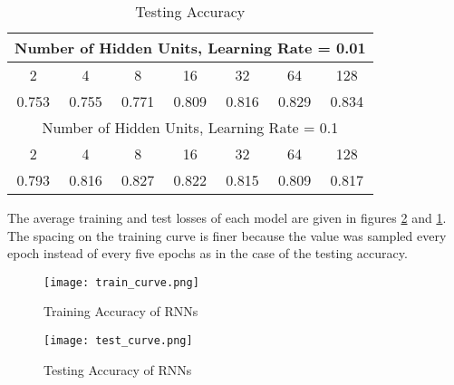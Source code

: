 \begin{table}
\centering
\begin{tabular}{ |c|c|c|c|c|c|c|}
    \hline
    \multicolumn{7}{|c|}{Number of Hidden Units, Learning Rate = 0.01}\\ \hline
    2 & 4 & 8 & 16 & 32 & 64 & 128 \\ \hline
    0.753 & 0.755 & 0.771 & 0.809 & 0.816 & 0.829 & 0.834 \\ \hline
    \multicolumn{7}{|c|}{Number of Hidden Units, Learning Rate = 0.1}\\ \hline
    2 & 4 & 8 & 16 & 32 & 64 & 128 \\ \hline
    0.793 & 0.816 & 0.827 & 0.822 & 0.815 & 0.809 & 0.817 \\ \hline
\end{tabular}
\caption{Testing Accuracy}
\label{tab:test_accuracy}
\end{table}

The average training and test losses of each model are given in figures \ref{fig:train_curve} and \ref{fig:test_curve}.  The spacing on the training curve is finer because the value was sampled every epoch instead of every five epochs as in the case of the testing accuracy.


\begin{figure}
    \centering
    \texttt{[image: train\_curve.png]}
    \caption{Training Accuracy of RNNs}
    \label{fig:test_curve}
\end{figure}

\begin{figure}
    \centering
    \texttt{[image: test\_curve.png]}
    \caption{Testing Accuracy of RNNs}
    \label{fig:train_curve}
\end{figure}
